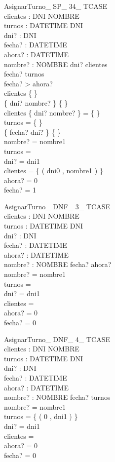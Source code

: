 \documentclass[%
  fleqn,colorlinks,linkcolor=blue,citecolor=blue,urlcolor=blue]{eptcs}
\begin{document}
\begin{schema}{AsignarTurno\_ SP\_ 34\_ TCASE}\\
 clientes : DNI \pfun NOMBRE \\
 turnos : DATETIME \pfun DNI \\
 dni? : DNI \\
 fecha? : DATETIME \\
 ahora? : DATETIME \\
 nombre? : NOMBRE
\where
 dni? \notin \dom clientes \\
 fecha? \notin \dom turnos \\
 fecha? > ahora? \\
 clientes \neq \{ \} \\
 \{ dni? \mapsto nombre? \} \neq \{ \} \\
 clientes \cap \{ dni? \mapsto nombre? \} = \{ \} \\
 turnos = \{ \} \\
 \{ fecha? \mapsto dni? \} \neq \{ \} \\
 nombre? = nombre1 \\
 turnos =~\emptyset \\
 dni? = dni1 \\
 clientes = \{ ( dni0 , nombre1 ) \} \\
 ahora? = 0 \\
 fecha? = 1
\end{schema}


\begin{schema}{AsignarTurno\_ DNF\_ 3\_ TCASE}\\
 clientes : DNI \pfun NOMBRE \\
 turnos : DATETIME \pfun DNI \\
 dni? : DNI \\
 fecha? : DATETIME \\
 ahora? : DATETIME \\
 nombre? : NOMBRE
\where
 fecha? \leq ahora? \\
 nombre? = nombre1 \\
 turnos =~\emptyset \\
 dni? = dni1 \\
 clientes =~\emptyset \\
 ahora? = 0 \\
 fecha? = 0
\end{schema}


\begin{schema}{AsignarTurno\_ DNF\_ 4\_ TCASE}\\
 clientes : DNI \pfun NOMBRE \\
 turnos : DATETIME \pfun DNI \\
 dni? : DNI \\
 fecha? : DATETIME \\
 ahora? : DATETIME \\
 nombre? : NOMBRE
\where
 fecha? \in \dom turnos \\
 nombre? = nombre1 \\
 turnos = \{ ( 0 , dni1 ) \} \\
 dni? = dni1 \\
 clientes =~\emptyset \\
 ahora? = 0 \\
 fecha? = 0
\end{schema}
\end{document}
